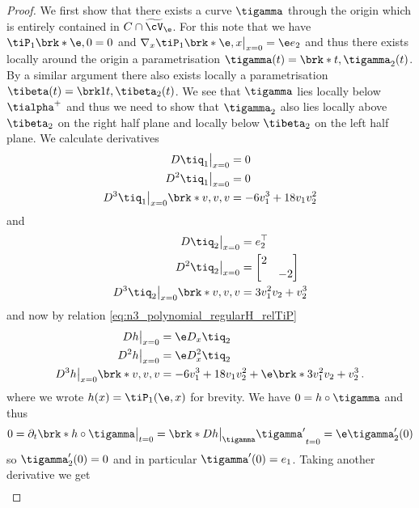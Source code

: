 \begin{proof}
  We first show that there exists a curve $\tigamma$ through the origin which is
  entirely contained in $C\cap \widetilde{\cV}_\e$.
  For this note that we have $\tiP_1\brk*{\e,0}=0$ and $\nabla_x\tiP_1\brk*{\e,x}\big\vert_{x=0}=\e e_2$
  and thus there exists locally around the origin a parametrisation $\tigamma(t)=\brk*{t,\tigamma_2(t)}$.
  By a similar argument there also exists locally a parametrisation $\tibeta(t)=\brk1{t,\tibeta_2(t)}$.
  We see that $\tigamma$ lies locally below $\tialpha^+$ and thus we need to show that $\tigamma_2$ also lies locally
  above $\tibeta_2$ on the right half plane and locally below $\tibeta_2$ on the left half plane.
  We calculate derivatives
  \begin{align*}
    D\tiq_1\big\vert_{x=0}&=0 \\
    D^2\tiq_1\big\vert_{x=0}&=0 \\
    D^3\tiq_1\big\vert_{x=0}\brk*{v,v,v}&=-6v_1^3+18v_1v_2^2
  \end{align*}
  and
  \begin{align*}
    D\tiq_2\big\vert_{x=0}&=e_2^\top\\
    D^2\tiq_2\big\vert_{x=0}&=\begin{bmatrix}
      2&\\
      &-2
    \end{bmatrix} \\
    D^3\tiq_2\big\vert_{x=0}\brk*{v,v,v}&=3v_1^2v_2+v_2^3
  \end{align*}
  and now by relation \eqref{eq:n3_polynomial_regularH_relTiP}
  \begin{align}
    \begin{aligned}
    Dh\big\vert_{x=0}&=\e D_x\tiq_2\\
    D^2h\big\vert_{x=0}&=\e D_x^2\tiq_2 \\
    D^3h\big\vert_{x=0}\brk*{v,v,v}&=-6v_1^3+18v_1v_2^2+\e\brk*{3v_1^2v_2+v_2^3}
    \,.
    \end{aligned}
    \label{eq:n3_polynomial_regularH_DPDq}
  \end{align}
  where we wrote $h(x)=\tiP_1(\e,x)$ for brevity. We have $0=h\circ\tigamma$ and thus
  \begin{align}
    0=\partial_t\brk*{h\circ\tigamma}\big\vert_{t=0}=\brk*{Dh\big\vert_{\tigamma}\tigamma'}_{t=0}
    =\e\tigamma_2'(0)\label{eq:n3_polynomial_regularH_gammaDer1}
  \end{align}
  so $\tigamma_2'(0)=0$ and in particular $\tigamma'(0)=e_1$.
  Taking another derivative we get
  \begin{align}

\end{align}
\end{proof}
